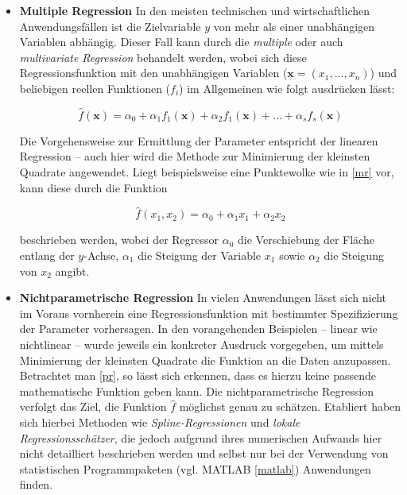\begin{itemize}




\item \textbf{Multiple Regression}\enlargethispage{2\baselineskip} 
In den meisten technischen und wirtschaftlichen Anwendungsfällen ist die Zielvariable $y$ von mehr als einer unabhängigen Variablen abhängig. Dieser Fall kann durch die \textit{multiple} oder auch \textit{multivariate Regression} behandelt werden, wobei sich diese Regressionsfunktion mit den unabhängigen Variablen ($\boldsymbol{x} = (x_1,...,x_n)$) und beliebigen reellen Funktionen ($f_i$) im Allgemeinen wie folgt ausdrücken lässt:

\begin{equation}
	\hat{f}(\boldsymbol{x}) = \alpha_0 + \alpha_1 f_1(\boldsymbol{x}) + \alpha_2 f_1(\boldsymbol{x}) + ... + \alpha_s f_s(\boldsymbol{x}) 
\end{equation}

Die Vorgehensweise zur Ermittlung der Parameter entspricht der linearen Regression -- auch hier wird die Methode zur Minimierung der kleinsten Quadrate angewendet. Liegt beispielsweise eine Punktewolke wie in \vref{mr} vor, kann diese durch die Funktion

\begin{equation}
	\hat{f}(x_1,x_2) = \alpha_0 + \alpha_1 x_1 + \alpha_2 x_2
\end{equation}

beschrieben werden, wobei der Regressor $\alpha_0$ die Verschiebung der Fläche entlang der $y$-Achse, $\alpha_1$ die Steigung der Variable $x_1$ sowie $\alpha_2$ die Steigung von $x_2$ angibt. 




\item \textbf{Nichtparametrische Regression}
In vielen Anwendungen lässt sich nicht im Voraus vornherein eine Regressionsfunktion mit bestimmter Spezifizierung der Parameter vorhersagen. In den vorangehenden Beispielen -- linear wie nichtlinear -- wurde jeweils ein konkreter Ausdruck vorgegeben, um mittels Minimierung der kleinsten Quadrate die Funktion an die Daten anzupassen. Betrachtet man \vref{pr}, so lässt sich erkennen, dass es hierzu keine passende mathematische Funktion geben kann. Die nichtparametrische Regression verfolgt das Ziel, die Funktion $\hat{f}$ möglichst genau zu schätzen. Etabliert haben sich hierbei Methoden wie \textit{Spline-Regressionen} und \textit{lokale Regressionsschätzer}, die jedoch aufgrund ihres numerischen Aufwands hier nicht detailliert beschrieben werden und selbst nur bei der Verwendung von statistischen Programmpaketen (vgl. MATLAB \vref{matlab}) Anwendungen finden.


\end{itemize}
